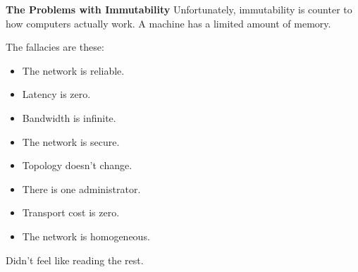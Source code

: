\textbf{The Problems with Immutability} 
Unfortunately, immutability is counter to how computers actually work. A machine has a
limited amount of memory.


The fallacies are these:

\begin{itemize}
\item The network is reliable.
\item Latency is zero.
\item Bandwidth is infinite.
\item The network is secure.
\item Topology doesn’t change.
\item There is one administrator.
\item Transport cost is zero.
\item The network is homogeneous.
\end{itemize}

Didn't feel like reading the rest.